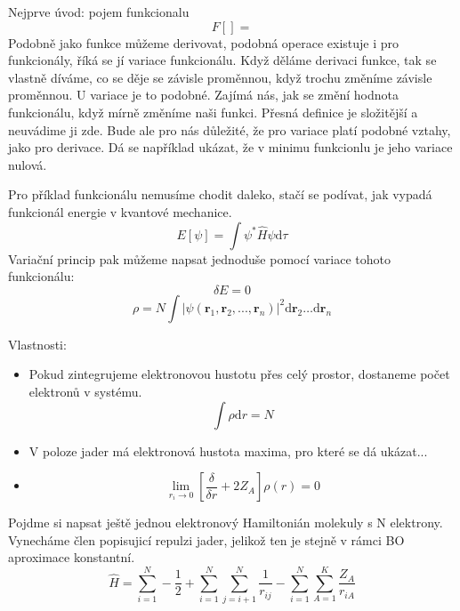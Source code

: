 
Nejprve úvod:
pojem funkcionalu
$$
F[]=
$$
Podobně jako funkce můžeme derivovat, podobná operace existuje i pro funkcionály, říká se jí variace funkcionálu.
Když děláme derivaci funkce, tak se vlastně díváme, co se děje se závisle proměnnou, když trochu změníme závisle proměnnou.
U variace je to podobné. Zajímá nás, jak se změní hodnota funkcionálu, když mírně změníme naši funkci. Přesná definice je složitější a neuvádime ji zde. Bude ale pro nás důležité, že pro variace platí podobné vztahy, jako pro derivace. Dá se například ukázat, že v minimu funkcionlu je jeho variace nulová.

Pro příklad funkcionálu nemusíme chodit daleko, stačí se podívat, jak vypadá funkcionál energie v kvantové mechanice. 
$$
E[\psi] = \int \psi^*\hat{H}\psi \mathrm{d}\tau
$$
Variační princip pak můžeme napsat jednoduše pomocí variace tohoto funkcionálu:
$$
\delta E = 0
$$
\begin{equation}
\rho=N \int |\psi(\textbf{r}_1,\textbf{r}_2,...,\textbf{r}_n)|^2 \mathrm{d}\textbf{r}_2\dots\mathrm{d}\textbf{r}_n
\end{equation}

Vlastnosti:
\begin{itemize}
\item Pokud zintegrujeme elektronovou hustotu přes celý prostor, dostaneme počet elektronů v systému.
\begin{equation}
\int \rho\mathrm{d}r = N
\end{equation}
\item V poloze jader má elektronová hustota maxima, pro které se dá ukázat...
\item 
\begin{equation}
\lim_{r_i \to 0} \left[ \frac{\delta}{\delta r}+2Z_A\right]\rho(r)=0
\end{equation}

\end{itemize}

Pojdme si napsat ještě jednou elektronový Hamiltonián molekuly s N elektrony. Vynecháme člen popisujicí repulzi jader, jelikož ten je stejně v rámci BO aproximace konstantní. 
\begin{equation}
\hat{H}=\sum_{i=1}^N -\frac{1}{2}+\sum_{i=1}^N\sum_{j=i+1}^N\frac{1}{r_{ij}}-\sum_{i=1}^N\sum_{A=1}^K \frac{Z_A}{r_{iA}}
\end{equation}

